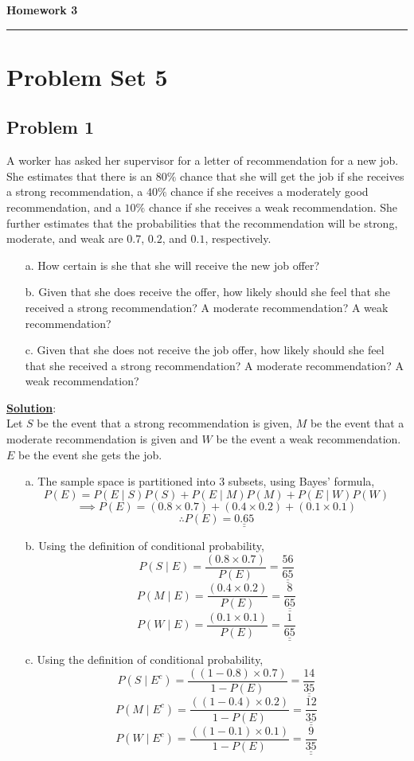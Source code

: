 \documentclass[11pt,letter paper]{report}
\begin{document}

\begin{center}
{\bf \Large Homework 3} 
\vspace{0.2cm}
\hrule
\end{center}

%
\section*{Problem Set 5}

\subsection*{Problem 1}
A worker has asked her supervisor for a letter of recommendation for a new job. She estimates that there is an $80\%$ chance that she will get the job if she receives a strong recommendation, a $40\%$ chance if she receives a moderately good recommendation, and a $10\%$ chance if she receives a weak recommendation. She further estimates that the probabilities that the recommendation will be strong, moderate, and weak are $0.7$, $0.2$, and $0.1$, respectively.
\begin{itemize}
\item[a.] How certain is she that she will receive the new job offer? 
\item[b.] Given that she does receive the offer, how likely should she feel that she received a strong recommendation? A moderate recommendation? A weak recommendation?
\item[c.] Given that she does not receive the job offer, how likely should she feel that she received a strong recommendation? A moderate recommendation? A weak recommendation?
\end{itemize}
{\bf \underline{Solution}}:\\ 
Let $S$ be the event that a strong recommendation is given, $M$ be the event that a moderate recommendation is given and $W$ be the event a  weak recommendation. $E$ be the event she gets the job. 
\begin{itemize}
\item[a.] The sample space is partitioned into $3$ subsets, using Bayes' formula, 
$$P(E)=P(E\mid S)P(S)+P(E\mid M)P(M)+P(E\mid W)P(W)$$
$$\implies P(E)=(0.8\times 0.7)+(0.4\times 0.2)+(0.1\times 0.1)$$
$$\therefore P(E)=\underline{\underline{0.65}}$$
\item[b.] Using the definition of conditional probability, 
$$P(S\mid E)=\frac{(0.8\times 0.7)}{P(E)}=\underline{\underline{\frac{56}{65}}}$$
$$P(M\mid E)=\frac{(0.4\times 0.2)}{P(E)}=\underline{\underline{\frac{8}{65}}}$$
$$P(W\mid E)=\frac{(0.1\times 0.1)}{P(E)}=\underline{\underline{\frac{1}{65}}}$$
\item[c.] Using the definition of conditional probability, 
$$P(S\mid E^c)=\frac{((1-0.8)\times 0.7)}{1-P(E)}=\underline{\underline{\frac{14}{35}}}$$
$$P(M\mid E^c)=\frac{((1-0.4)\times 0.2)}{1-P(E)}=\underline{\underline{\frac{12}{35}}}$$
$$P(W\mid E^c)=\frac{((1-0.1)\times 0.1)}{1-P(E)}=\underline{\underline{\frac{9}{35}}}$$
\end{itemize}
\end{document}
